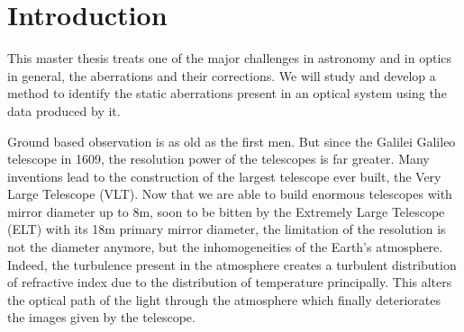 
\chapter*{Introduction} %
\label{Introduction} %


\newcommand{\keyword}[1]{\textbf{#1}}
\newcommand{\tabhead}[1]{\textbf{#1}}
\newcommand{\code}[1]{\texttt{#1}}
\newcommand{\file}[1]{\texttt{\bfseries#1}}
\newcommand{\option}[1]{\texttt{\itshape#1}}


This master thesis treats one of the major challenges in astronomy and in optics in general, the aberrations and their corrections. We will study and develop a method to identify the static aberrations present in an  optical system using the data produced by it.

\vspace{1cm}


Ground based observation is as old as the first men. But since the Galilei Galileo telescope in 1609, the resolution power of the telescopes is far greater. Many inventions lead to the construction of the largest telescope ever built, the Very Large Telescope (VLT). Now that we are able to build enormous telescopes with mirror diameter up to 8m, soon to be bitten by the Extremely Large Telescope (ELT) with its 18m primary mirror diameter, the limitation of the resolution is not the diameter anymore, but the inhomogeneities of the Earth's atmosphere. Indeed, the turbulence present in the atmosphere creates a turbulent distribution of refractive index due to the distribution of temperature principally. This alters the optical path of the light through the atmosphere which finally deteriorates the images given by the telescope.

